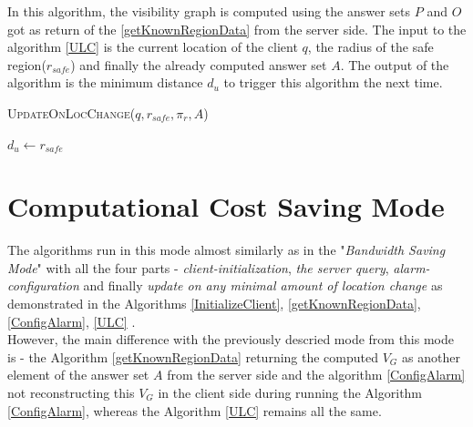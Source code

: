 In this algorithm, the visibility graph is computed using the answer sets $P$ and $O$ got as return of the \ref{getKnownRegionData} from the server side.
The input to the algorithm \ref{ULC} is the current location of the client $q$, the radius of the safe region($r_{safe}$) and finally the already computed answer set $A$. The output of the algorithm is the minimum distance $d_u$ to trigger this algorithm the next time.

\begin{algorithm}
\caption{\textsc{UpdateOnLocChange}($q, r_{safe}, \pi_r, A$)}
\label{ULC}

    
    
    
    \Return $d_u \gets r_{safe}$

\end{algorithm}

\section{Computational Cost Saving Mode}
\label{CCS}
The algorithms run in this mode almost similarly as in the "\textit{Bandwidth Saving Mode}" with all the four parts - \textit{client-initialization}, \textit{the server query}, \textit{alarm-configuration} and finally \textit{update on any minimal amount of location change} as demonstrated in the Algorithms \ref{InitializeClient}, \ref{getKnownRegionData}, \ref{ConfigAlarm}, \ref{ULC} .\\

However, the main difference with the previously descried mode from this mode is - the Algorithm \ref{getKnownRegionData} returning the computed $V_G$ as another element of the answer set $A$ from the server side and the algorithm \ref{ConfigAlarm} not reconstructing this $V_G$ in the client side during running the Algorithm \ref{ConfigAlarm}, whereas the Algorithm \ref{ULC} remains all the same.

